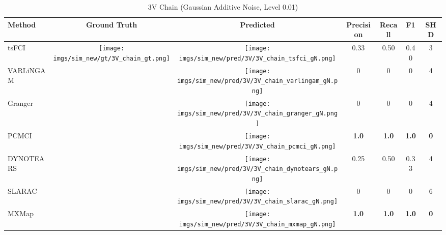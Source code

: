 \begin{table}[htb]
\begin{tabular}{l|c|c|c|c|c|c}
Method    & Ground Truth      & Predicted & Precision    & Recall        & F1           & SHD        \\ \hline
tsFCI     & \multirow{7}{*}[-3em]{\begin{minipage}{.17\linewidth} \centering \texttt{[image: imgs/sim\_new/gt/3V\_chain\_gt.png]} \end{minipage}} & \begin{minipage}{.17\linewidth} \centering \texttt{[image: imgs/sim\_new/pred/3V/3V\_chain\_tsfci\_gN.png]} \end{minipage}& 0.33         & 0.50          & 0.40         & 3          \\
VARLiNGAM &                   & \begin{minipage}{.17\linewidth} \centering \texttt{[image: imgs/sim\_new/pred/3V/3V\_chain\_varlingam\_gN.png]} \end{minipage}& 0            & 0    & 0            & 4          \\
Granger   &                   & \begin{minipage}{.17\linewidth} \centering \texttt{[image: imgs/sim\_new/pred/3V/3V\_chain\_granger\_gN.png]} \end{minipage} & 0            & 0             & 0            & 4          \\
PCMCI     &                   &\begin{minipage}{.17\linewidth} \centering \texttt{[image: imgs/sim\_new/pred/3V/3V\_chain\_pcmci\_gN.png]} \end{minipage}& \textbf{1.0} & \textbf{1.0}  & \textbf{1.0} & \textbf{0} \\
DYNOTEARS &                   &\begin{minipage}{.17\linewidth} \centering \texttt{[image: imgs/sim\_new/pred/3V/3V\_chain\_dynotears\_gN.png]} \end{minipage} & 0.25         & 0.50 & 0.33         & 4          \\
SLARAC    &                   & \begin{minipage}{.17\linewidth} \centering \texttt{[image: imgs/sim\_new/pred/3V/3V\_chain\_slarac\_gN.png]} \end{minipage}& 0            & 0             & 0            & 6          \\ \cline{1-1} \cline{3-7} 
MXMap     &                   &\begin{minipage}{.17\linewidth} \centering \texttt{[image: imgs/sim\_new/pred/3V/3V\_chain\_mxmap\_gN.png]} \end{minipage} & \textbf{1.0} & \textbf{1.0}  & \textbf{1.0} & \textbf{0}
\end{tabular}
\caption{3V Chain (Gaussian Additive Noise, Level 0.01)}
\label{tab:3V_chain_gN}
\end{table}

